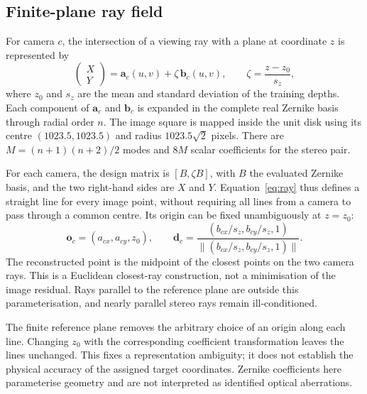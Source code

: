 \documentclass[10pt,a4paper]{article}
\begin{document}
\subsection{Finite-plane ray field}
For camera $c$, the intersection of a viewing ray with a plane at coordinate $z$ is represented by
\begin{equation}
 \begin{pmatrix}X\\Y\end{pmatrix}
 =\mathbf a_c(u,v)+\zeta\,\mathbf b_c(u,v),
 \qquad \zeta=\frac{z-z_0}{s_z},
 \label{eq:ray}
\end{equation}
where $z_0$ and $s_z$ are the mean and standard deviation of the training depths. Each component of $\mathbf a_c$ and $\mathbf b_c$ is expanded in the complete real Zernike basis through radial order $n$. The image square is mapped inside the unit disk using its centre $(1023.5,1023.5)$ and radius $1023.5\sqrt{2}$ pixels. There are $M=(n+1)(n+2)/2$ modes and $8M$ scalar coefficients for the stereo pair.

For each camera, the design matrix is $[B,\zeta B]$, with $B$ the evaluated Zernike basis, and the two right-hand sides are $X$ and $Y$. Equation~\eqref{eq:ray} thus defines a straight line for every image point, without requiring all lines from a camera to pass through a common centre. Its origin can be fixed unambiguously at $z=z_0$:
\begin{equation}
 \mathbf o_c=(a_{cx},a_{cy},z_0),\qquad
 \mathbf d_c=\frac{(b_{cx}/s_z,b_{cy}/s_z,1)}{\|(b_{cx}/s_z,b_{cy}/s_z,1)\|}.
\end{equation}
The reconstructed point is the midpoint of the closest points on the two camera rays. This is a Euclidean closest-ray construction, not a minimisation of the image residual. Rays parallel to the reference plane are outside this parameterisation, and nearly parallel stereo rays remain ill-conditioned.

The finite reference plane removes the arbitrary choice of an origin along each line. Changing $z_0$ with the corresponding coefficient transformation leaves the lines unchanged. This fixes a representation ambiguity; it does not establish the physical accuracy of the assigned target coordinates. Zernike coefficients here parameterise geometry and are not interpreted as identified optical aberrations.
\end{document}
